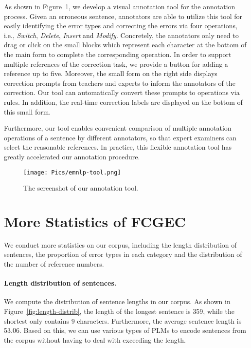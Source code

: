\documentclass[11pt]{article}
\begin{document}
As shown in Figure~\ref{fig:anno-tool}, we develop a visual annotation tool for the annotation process. Given an erroneous sentence, annotators are able to utilize this tool for easily identifying the error types and correcting the errors via four operations, i.e., \emph{Switch}, \emph{Delete}, \emph{Insert} and \emph{Modify}. Concretely, the annotators only need to drag or click on the small blocks which represent each character at the bottom of the main form to complete the corresponding operation. In order to support multiple references of the correction task, we provide a button for adding a reference up to five. Moreover, the small form on the right side displays correction prompts from teachers and experts to inform the annotators of the correction. Our tool can automatically convert these prompts to operations via rules. In addition, the real-time correction labels are displayed on the bottom of this small form.

Furthermore, our tool enables convenient comparison of multiple annotation operations of a sentence by different annotators, so that expert examiners can select the reasonable references. In practice, this flexible annotation tool has greatly accelerated our annotation procedure.

\begin{figure}[ht]
	\centering
	\texttt{[image: Pics/emnlp-tool.png]} 
	\caption{The screenshot of our annotation tool.}
	\label{fig:anno-tool}
\end{figure}
 
\section{More Statistics of FCGEC}
\label{appendix:errortype}

We conduct more statistics on our corpus, including the length distribution of sentences, the proportion of error types in each category and the distribution of the number of reference numbers.

\paragraph{Length distribution of sentences.}

We compute the distribution of sentence lengths in our corpus. As shown in Figure~\ref{fig:length-distrib}, the length of the longest sentence is 359, while the shortest only contains 9 characters. Furthermore, the average sentence length is 53.06. Based on this, we can use various types of PLMs to encode sentences from the corpus without having to deal with exceeding the length. 
\end{document}
